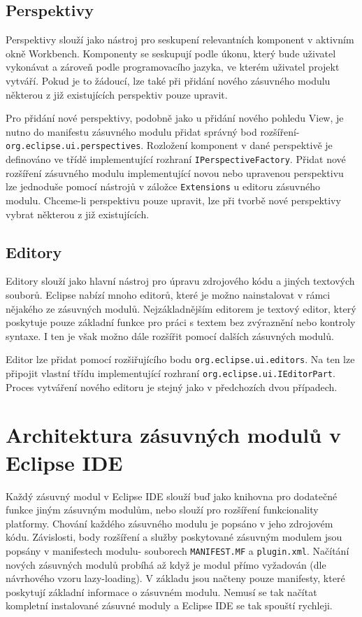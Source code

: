     
    \subsection{Perspektivy}
    Perspektivy slouží jako nástroj pro seskupení relevantních komponent v aktivním okně Workbench. Komponenty se seskupují podle úkonu, který bude uživatel vykonávat a  zároveň podle programovacího jazyka, ve kterém uživatel projekt vytváří. Pokud je to žádoucí, lze také při přidání nového zásuvného modulu některou z již existujících perspektiv pouze upravit.

    Pro přidání nové perspektivy, podobně jako u přidání nového pohledu View, je nutno do manifestu zásuvného modulu přidat správný bod rozšíření- \texttt{org.eclipse.ui.perspectives}. Rozložení komponent v dané perspektivě je definováno ve třídě implementující rozhraní \texttt{IPerspectiveFactory}. Přidat nové rozšíření zásuvného modulu implementující novou nebo upravenou perspektivu lze jednoduše pomocí nástrojů v záložce \texttt{Extensions} u editoru zásuvného modulu. Chceme-li perspektivu pouze upravit, lze při tvorbě nové perspektivy vybrat některou z již existujících.

    \subsection{Editory}
    Editory slouží jako hlavní nástroj pro úpravu zdrojového kódu a jiných textových souborů. Eclipse nabízí mnoho editorů, které je možno nainstalovat v rámci nějakého ze zásuvných modulů. Nejzákladnějším editorem je textový editor, který poskytuje pouze základní funkce pro práci s textem bez zvýraznění nebo kontroly syntaxe. I ten je však možno dále rozšířit pomocí dalších zásuvných modulů.

    Editor lze přidat pomocí rozšiřujícího bodu \texttt{org.eclipse.ui.editors}. Na ten lze připojit vlastní třídu implementující rozhraní \texttt{org.eclipse.ui.IEditorPart}. Proces vytváření nového editoru je stejný jako v předchozích dvou případech.

  \section{Architektura zásuvných modulů v Eclipse IDE}
  Každý zásuvný modul v Eclipse IDE slouží buď jako knihovna pro dodatečné funkce jiným zásuvným modulům, nebo slouží pro rozšíření funkcionality platformy. Chování každého zásuvného modulu je popsáno v jeho zdrojovém kódu. Závislosti, body rozšíření a služby poskytované  zásuvným modulem jsou popsány v manifestech modulu- souborech \texttt{MANIFEST.MF} a \texttt{plugin.xml}. Načítání nových zásuvných modulů probíhá až když je modul přímo vyžadován (dle návrhového vzoru lazy-loading). V základu jsou načteny pouze manifesty, které poskytují základní informace o zásuvném modulu. Nemusí se tak načítat kompletní instalované zásuvné moduly a Eclipse IDE se tak spouští rychleji.

